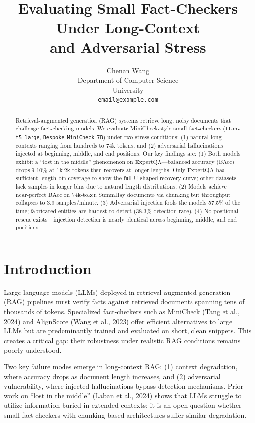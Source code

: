 \documentclass{article}
\title{Evaluating Small Fact-Checkers Under Long-Context\\and Adversarial Stress}
\author{
  Chenan Wang \\
  Department of Computer Science\\
  University\\
  \texttt{email@example.com}
}
\begin{document}
\maketitle

\begin{abstract}
Retrieval-augmented generation (RAG) systems retrieve long, noisy documents that challenge fact-checking models. We evaluate MiniCheck-style small fact-checkers (\texttt{flan-t5-large}, \texttt{Bespoke-MiniCheck-7B}) under two stress conditions: (1) natural long contexts ranging from hundreds to 74k tokens, and (2) adversarial hallucinations injected at beginning, middle, and end positions. Our key findings are: (1) Both models exhibit a ``lost in the middle'' phenomenon on ExpertQA---balanced accuracy (BAcc) drops 9-10\% at 1k-2k tokens then recovers at longer lengths. Only ExpertQA has sufficient length-bin coverage to show the full U-shaped recovery curve; other datasets lack samples in longer bins due to natural length distributions. (2) Models achieve near-perfect BAcc on 74k-token SummHay documents via chunking but throughput collapses to 3.9 samples/minute. (3) Adversarial injection fools the models 57.5\% of the time; fabricated entities are hardest to detect (38.3\% detection rate). (4) No positional rescue exists---injection detection is nearly identical across beginning, middle, and end positions.
\end{abstract}

\section{Introduction}

Large language models (LLMs) deployed in retrieval-augmented generation (RAG) pipelines must verify facts against retrieved documents spanning tens of thousands of tokens. Specialized fact-checkers such as MiniCheck (Tang et al., 2024) and AlignScore (Wang et al., 2023) offer efficient alternatives to large LLMs but are predominantly trained and evaluated on short, clean snippets. This creates a critical gap: their robustness under realistic RAG conditions remains poorly understood.

Two key failure modes emerge in long-context RAG: (1) context degradation, where accuracy drops as document length increases, and (2) adversarial vulnerability, where injected hallucinations bypass detection mechanisms. Prior work on ``lost in the middle'' (Laban et al., 2024) shows that LLMs struggle to utilize information buried in extended contexts; it is an open question whether small fact-checkers with chunking-based architectures suffer similar degradation.
\end{document}
